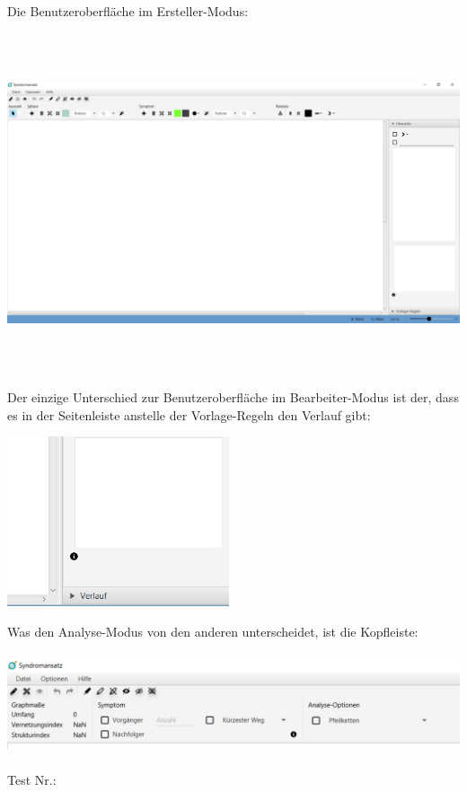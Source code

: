 \documentclass[enabledeprecatedfontcommands]{scrartcl}
\begin{document}
Die Benutzeroberfläche im Ersteller-Modus:
\begin{center}
	\includegraphics[height=10cm, angle = 90]{erstellerModus.PNG}
\end{center}
\newpage
Der einzige Unterschied zur Benutzeroberfläche im Bearbeiter-Modus ist der, dass es in der Seitenleiste anstelle der Vorlage-Regeln den Verlauf gibt:
\begin{center}
	\includegraphics[height=5cm]{bearbeiterModus.PNG}
\end{center}
Was den Analyse-Modus von den anderen unterscheidet, ist die Kopfleiste:
\begin{center}
	\includegraphics[height=3cm]{analyseModus.PNG}
\end{center}

\hfill Test Nr.: \setlength{\fboxsep}{1pt}
\end{document}
